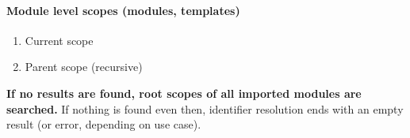 \paragraph{Module level scopes (modules, templates)}
\begin{enumerate}
	\item Current scope
	\item Parent scope (recursive)
\end{enumerate}

\begin{comment}
\textbf{Namespace scopes}
\begin{compactenum}
\item Current scope and scopes of all namespaces with the same (full) identifier in any of the modules that have been imported in the identifier resolution scope (that means also all imports derived from parent scopes).
\item Parent scope (recursive)
\end{compactenum}
\end{comment}

\textbf{If no results are found, root scopes of all imported modules are searched.} If nothing is found even then, identifier resolution ends with an empty result (or error, depending on use case).

\begin{comment}
\begin{code}
module a;

Void a() {}
Void b() {}

Void f() {
// First, we search in the current scope (inside the function) -> not found
// Then, we search in the parent scope (which is the module scope) -> found function a
a();

Int a;

// Now when we search in the current scope, we find variable a
a = 5;
}

$\moduleSep$
module b;

Void a() {}

class C {

@public:
Void a() {}
Void c() {}
Void f() {

}	

}

class D : @public C {

@public:
Void c() {}
Void g() {

}

}
\end{code}
\end{comment}

